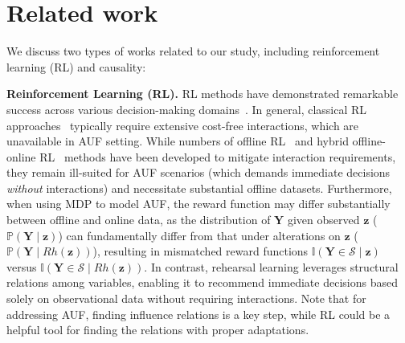 \documentclass{article}
\theoremstyle{plain}
\theoremstyle{definition}
\def \Y{\mathbf{Y}}
\def \sS {\mathcal{S}}
\def \Y {\mathbf{Y}}
\def \z {\mathbf{z}}
\begin{document}
\section{Related work}
\label{sec:related_work}
We discuss two types of works related to our study, including reinforcement learning (RL) and causality:


\noindent\textbf{Reinforcement Learning (RL).} RL methods have demonstrated remarkable success across various decision-making domains~\citep{sutton2018reinforcement}. 
In general, classical RL approaches~\citep{Lillicrap2016ddpg, haarnoja2018SAC} typically require extensive cost-free interactions, which are unavailable in AUF setting. 
While numbers of offline RL~\citep{pmlr-v202-li23av, NEURIPS2023_c1aaf7c3} and hybrid offline-online RL~\citep{song2022hybrid, pong2022offline} methods have been developed to mitigate interaction requirements, they remain ill-suited for AUF scenarios (which demands immediate decisions \emph{without} interactions) and necessitate substantial offline datasets. 
Furthermore, when using MDP to model AUF, the reward function may differ substantially between offline and online data, as the distribution of \(\Y\) given observed \(\z\) (\(\mathbb{P}(\Y \mid \z)\)) can fundamentally differ from that under alterations on \(\z\) (\(\mathbb{P}(\Y \mid Rh(\z))\)), resulting in mismatched reward functions \(\mathbb{I}(\Y\in \sS \mid \z)\) versus \(\mathbb{I}(\Y\in \sS \mid Rh(\z))\). 
In contrast, rehearsal learning leverages structural relations among variables, enabling it to recommend immediate decisions based solely on observational data without requiring interactions. 
Note that for addressing AUF, finding influence relations is a key step, while RL could be a helpful tool for finding the relations with proper adaptations. 
\end{document}
